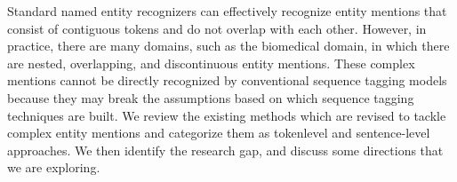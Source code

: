 Standard named entity recognizers can effectively recognize entity mentions that consist of contiguous tokens and do not overlap with each other. However, in practice, there are many domains, such as the biomedical domain, in which there are nested, overlapping, and discontinuous entity mentions. These complex mentions cannot be directly recognized by conventional sequence tagging models because they may break the assumptions based on which sequence tagging techniques are built. We review the existing methods which are revised to tackle complex entity mentions and categorize them as tokenlevel and sentence-level approaches. We then identify the research gap, and discuss some directions that we are exploring.
